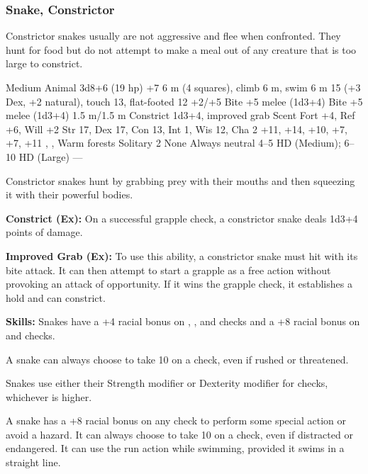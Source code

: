 \subsubsection{Snake, Constrictor}
Constrictor snakes usually are not aggressive and flee when confronted. They hunt for food but do not attempt to make a meal out of any creature that is too large to constrict.

\begin{MonsterStats}
{Medium Animal}
{3d8+6 (19 hp)}
{+7}
{6 m (4 squares), climb 6 m, swim 6 m}
{15 (+3 Dex, +2 natural), touch 13, flat-footed 12}
{+2/+5}
{Bite +5 melee (1d3+4)}
{Bite +5 melee (1d3+4)}
{1.5 m/1.5 m}
{Constrict 1d3+4, improved grab}
{Scent}
{Fort +4, Ref +6, Will +2}
{Str 17, Dex 17, Con 13, Int 1, Wis 12, Cha 2}
{ +11,  +14,  +10,  +7,  +7,  +11}
{, , }
{Warm forests}
{Solitary}
{2}
{None}
{Always neutral}
{4--5 HD (Medium); 6--10 HD (Large)}
{---}
\end{MonsterStats}

Constrictor snakes hunt by grabbing prey with their mouths and then squeezing it with their powerful bodies.

\textbf{Constrict (Ex):} On a successful grapple check, a constrictor snake deals 1d3+4 points of damage.

\textbf{Improved Grab (Ex):} To use this ability, a constrictor snake must hit with its bite attack. It can then attempt to start a grapple as a free action without provoking an attack of opportunity. If it wins the grapple check, it establishes a hold and can constrict.

\textbf{Skills:} Snakes have a +4 racial bonus on , , and  checks and a +8 racial bonus on  and  checks.

A snake can always choose to take 10 on a  check, even if rushed or threatened.

Snakes use either their Strength modifier or Dexterity modifier for  checks, whichever is higher.

A snake has a +8 racial bonus on any  check to perform some special action or avoid a hazard. It can always choose to take 10 on a  check, even if distracted or endangered. It can use the run action while swimming, provided it swims in a straight line.
